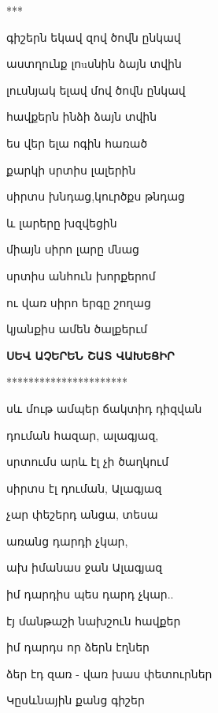                         \centerline{***}



                        գիշերն եկավ զով ծովն ընկավ


                        աստղունք լոuսնին ձայն տվին


                        լուսնյակ  ելավ մով ծովն ընկավ


                        հավքերն ինձի ձայն տվին


                        ես վեր ելա ոգին հառած


                        քարկի սրտիս լալերին

                        սիրտս խնդաց,կուրծքս թնդաց


                        և լարերը  խզվեցին


                        միայն  սիրո լարը մնաց


                        սրտիս անհուն խորքերոմ


                         ու վառ սիրո երգը շողաց


                         կյանքիս ամեն ծալքերւմ


                              {\bf ՍԵՎ ԱՉԵՐԵՆ ՇԱՏ ՎԱԽԵՑԻՐ}


                              \centerline{**********************}



                              սև մութ ամպեր ճակտիդ դիզվան


                          դուման հազար, ալագյազ,


                          սրտումս արև էլ չի ծաղկում

                                                                                                            սիրտս էլ դուման, Ալագյազ

                              չար փեշերդ անցա, տեսա


                              առանց դարդի  չկար,


                              ախ իմանաս  ջան Ալագյազ

                              իմ դարդիս պես դարդ չկար..


                            էյ մանթաշի նախշուն հավքեր

                            իմ դարդս որ ձերն էղներ

                            ձեր էդ զառ - վառ խաս փետուրներ

                            Կըսևնային քանց գիշեր
                          
